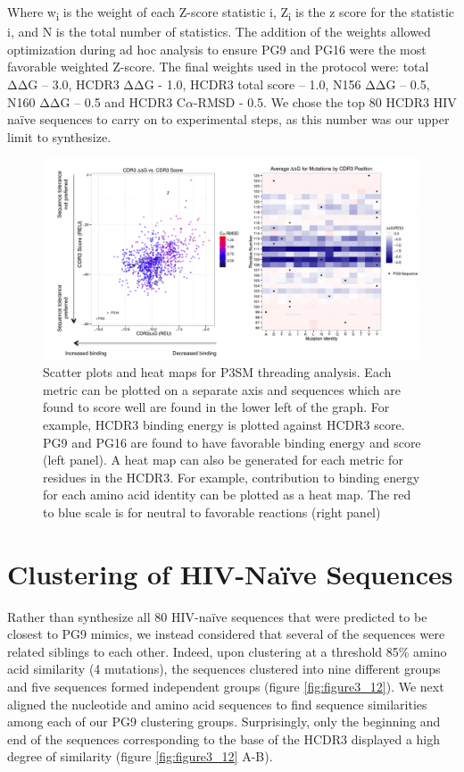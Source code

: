 Where w\textsubscript{i} is the weight of each Z-score statistic i, Z\textsubscript{i} is the z score for the statistic i, and N is the total number of statistics. The addition of the weights allowed optimization during ad hoc analysis to ensure PG9 and PG16 were the most favorable weighted Z-score. The final weights used in the protocol were: total ΔΔG – 3.0, HCDR3 ΔΔG - 1.0, HCDR3 total score – 1.0, N156 ΔΔG – 0.5, N160 ΔΔG – 0.5 and HCDR3 C$\alpha$-RMSD - 0.5. We chose the top 80 HCDR3 HIV naïve sequences to carry on to experimental steps, as this number was our upper limit to synthesize.

\begin{figure}
   \centering
   \includegraphics[width=.9\linewidth]{images/chapter3/figure3_11.pdf} %
   \caption[Scatter Plots and Heat Maps for P3SM Threading Analysis]{Scatter plots and heat maps for P3SM threading analysis. Each metric can be plotted on a separate axis and sequences which are found to score well are found in the lower left of the graph. For example, HCDR3 binding energy is plotted against HCDR3 score. PG9 and PG16 are found to have favorable binding energy and score (left panel). A heat map can also be generated for each metric for residues in the HCDR3. For example, contribution to binding energy for each amino acid identity can be plotted as a heat map. The red to blue scale is for neutral to favorable reactions (right panel)}
   \label{fig:figure3_11}
\end{figure}

\section{Clustering of HIV-Naïve Sequences}
Rather than synthesize all 80 HIV-naïve sequences that were predicted to be closest to PG9 mimics, we instead considered that several of the sequences were related siblings to each other. Indeed, upon clustering at a threshold 85\% amino acid similarity (4 mutations), the sequences clustered into nine different groups and five sequences formed independent groups (figure \ref{fig:figure3_12}).
We next aligned the nucleotide and amino acid sequences to find sequence similarities among each of our PG9 clustering groups. Surprisingly, only the beginning and end of the sequences corresponding to the base of the HCDR3 displayed a high degree of similarity (figure \ref{fig:figure3_12} A-B).

